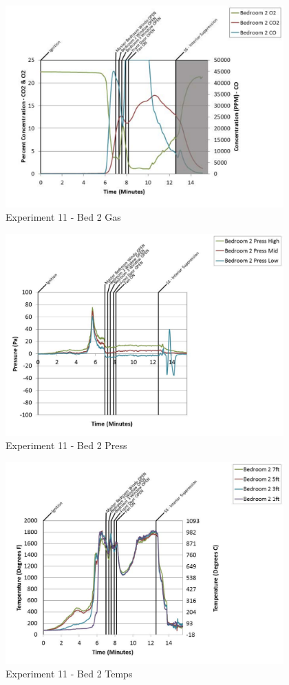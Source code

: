 \documentclass{article}
\begin{document}
\begin{appendices}
	\begin{figure}[h!]
		\centering
		\includegraphics[height=3.05in]{0_Images/Results_Charts/Exp_11_Charts/Bed2Gas.pdf}
		\caption{Experiment 11 - Bed 2 Gas}
	\end{figure}
 
	\clearpage

	\begin{figure}[h!]
		\centering
		\includegraphics[height=3.05in]{0_Images/Results_Charts/Exp_11_Charts/Bed2Press.pdf}
		\caption{Experiment 11 - Bed 2 Press}
	\end{figure}
 

	\begin{figure}[h!]
		\centering
		\includegraphics[height=3.05in]{0_Images/Results_Charts/Exp_11_Charts/Bed2Temps.pdf}
		\caption{Experiment 11 - Bed 2 Temps}
	\end{figure}
 

\end{appendices}
\end{document}
